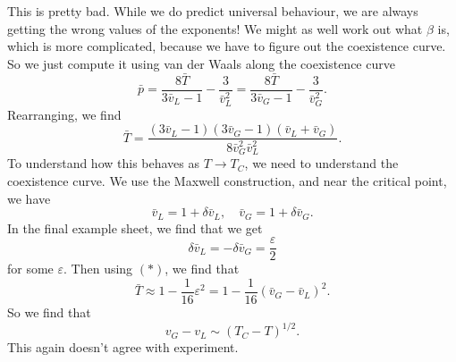 \documentclass[a4paper]{article}
\begin{document}
This is pretty bad. While we do predict universal behaviour, we are always getting the wrong values of the exponents! We might as well work out what $\beta$ is, which is more complicated, because we have to figure out the coexistence curve. So we just compute it using van der Waals along the coexistence curve
\[
  \bar{p} = \frac{8 \bar{T}}{ 3 \bar{v}_L - 1} - \frac{3}{\bar{v}_L^2} = \frac{8 \bar{T}}{ 3 \bar{v}_G - 1} - \frac{3}{\bar{v}_G^2}.
\]
Rearranging, we find
\[
  \bar{T} = \frac{(3 \bar{v}_L - 1)( 3 \bar{v}_G - 1) (\bar{v}_L + \bar{v}_G)}{8 \bar{v}_G^2 \bar{v}_L^2}.\tag{$*$}
\]
To understand how this behaves as $T \to T_C$, we need to understand the coexistence curve. We use the Maxwell construction, and near the critical point, we have
\[
  \bar{v}_L = 1 + \delta \bar{v}_L,\quad \bar{v}_G = 1 + \delta \bar{v}_G.
\]
In the final example sheet, we find that we get
\[
  \delta \bar{v}_L = - \delta \bar{v}_G = \frac{\varepsilon}{2}
\]
for some $\varepsilon$. Then using $(*)$, we find that
\[
  \bar{T} \approx 1 - \frac{1}{16}\varepsilon^2 = 1 - \frac{1}{16} (\bar{v}_G - \bar{v}_L)^2.
\]
So we find that
\[
  v_G - v_L \sim (T_C - T)^{1/2}.
\]
This again doesn't agree with experiment.
\end{document}
